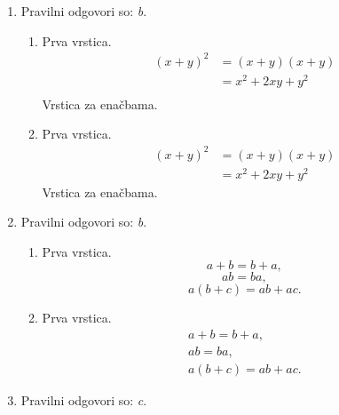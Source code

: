 \documentclass[11pt]{article}
\begin{document}
\begin{enumerate}
    \item Pravilni odgovori so: \emph{b}.
    \begin{enumerate}
        \item Prva vrstica.
\begin{align*}
  (x + y)^2 &= (x + y)(x + y) \\
  &= x^2 + 2 x y + y^2 \\
\end{align*}
        Vrstica za enačbama.
        \item Prva vrstica.
\begin{align*}
  (x + y)^2 &= (x + y)(x + y) \\
  &= x^2 + 2 x y + y^2
\end{align*}
        Vrstica za enačbama.
    \end{enumerate}

    \item Pravilni odgovori so: \emph{b}.
    \begin{enumerate}
        \item Prva vrstica.
\[ a + b = b + a, \]
\[ a b = b a, \]
\[ a (b + c) = a b + a c. \]
        \item Prva vrstica.
\begin{gather*}
  a + b = b + a, \\
  a b = b a, \\
  a (b + c) = a b + a c.
\end{gather*}
    \end{enumerate}

    \item Pravilni odgovori so: \emph{c}.

\end{enumerate}
\end{document}
